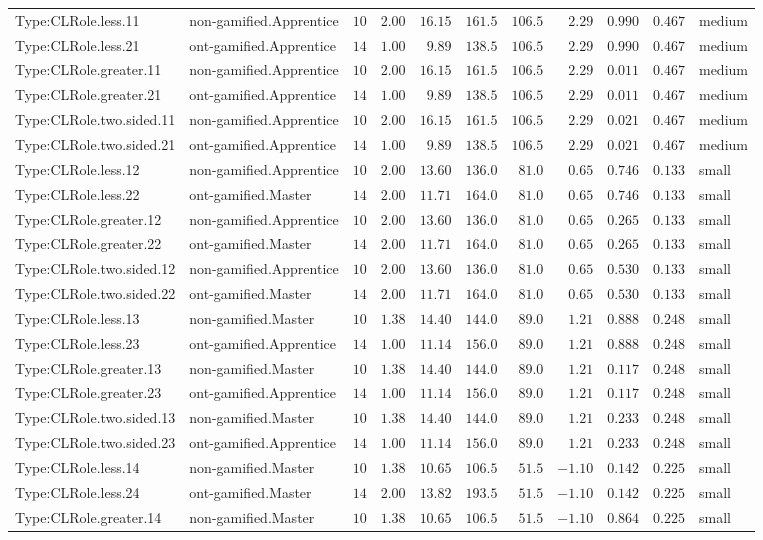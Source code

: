 \documentclass[6pt,a4paper]{article}
\begin{document}
{\begin{longtable}{llrrrrrrrrl}
Type:CLRole.less.11&non-gamified.Apprentice&$10$&$2.00$&$16.15$&$161.5$&$106.5$&$ 2.29$&$0.990$&$0.467$&medium\tabularnewline
Type:CLRole.less.21&ont-gamified.Apprentice&$14$&$1.00$&$ 9.89$&$138.5$&$106.5$&$ 2.29$&$0.990$&$0.467$&medium\tabularnewline
Type:CLRole.greater.11&non-gamified.Apprentice&$10$&$2.00$&$16.15$&$161.5$&$106.5$&$ 2.29$&$0.011$&$0.467$&medium\tabularnewline
Type:CLRole.greater.21&ont-gamified.Apprentice&$14$&$1.00$&$ 9.89$&$138.5$&$106.5$&$ 2.29$&$0.011$&$0.467$&medium\tabularnewline
Type:CLRole.two.sided.11&non-gamified.Apprentice&$10$&$2.00$&$16.15$&$161.5$&$106.5$&$ 2.29$&$0.021$&$0.467$&medium\tabularnewline
Type:CLRole.two.sided.21&ont-gamified.Apprentice&$14$&$1.00$&$ 9.89$&$138.5$&$106.5$&$ 2.29$&$0.021$&$0.467$&medium\tabularnewline
Type:CLRole.less.12&non-gamified.Apprentice&$10$&$2.00$&$13.60$&$136.0$&$ 81.0$&$ 0.65$&$0.746$&$0.133$&small\tabularnewline
Type:CLRole.less.22&ont-gamified.Master&$14$&$2.00$&$11.71$&$164.0$&$ 81.0$&$ 0.65$&$0.746$&$0.133$&small\tabularnewline
Type:CLRole.greater.12&non-gamified.Apprentice&$10$&$2.00$&$13.60$&$136.0$&$ 81.0$&$ 0.65$&$0.265$&$0.133$&small\tabularnewline
Type:CLRole.greater.22&ont-gamified.Master&$14$&$2.00$&$11.71$&$164.0$&$ 81.0$&$ 0.65$&$0.265$&$0.133$&small\tabularnewline
Type:CLRole.two.sided.12&non-gamified.Apprentice&$10$&$2.00$&$13.60$&$136.0$&$ 81.0$&$ 0.65$&$0.530$&$0.133$&small\tabularnewline
Type:CLRole.two.sided.22&ont-gamified.Master&$14$&$2.00$&$11.71$&$164.0$&$ 81.0$&$ 0.65$&$0.530$&$0.133$&small\tabularnewline
Type:CLRole.less.13&non-gamified.Master&$10$&$1.38$&$14.40$&$144.0$&$ 89.0$&$ 1.21$&$0.888$&$0.248$&small\tabularnewline
Type:CLRole.less.23&ont-gamified.Apprentice&$14$&$1.00$&$11.14$&$156.0$&$ 89.0$&$ 1.21$&$0.888$&$0.248$&small\tabularnewline
Type:CLRole.greater.13&non-gamified.Master&$10$&$1.38$&$14.40$&$144.0$&$ 89.0$&$ 1.21$&$0.117$&$0.248$&small\tabularnewline
Type:CLRole.greater.23&ont-gamified.Apprentice&$14$&$1.00$&$11.14$&$156.0$&$ 89.0$&$ 1.21$&$0.117$&$0.248$&small\tabularnewline
Type:CLRole.two.sided.13&non-gamified.Master&$10$&$1.38$&$14.40$&$144.0$&$ 89.0$&$ 1.21$&$0.233$&$0.248$&small\tabularnewline
Type:CLRole.two.sided.23&ont-gamified.Apprentice&$14$&$1.00$&$11.14$&$156.0$&$ 89.0$&$ 1.21$&$0.233$&$0.248$&small\tabularnewline
Type:CLRole.less.14&non-gamified.Master&$10$&$1.38$&$10.65$&$106.5$&$ 51.5$&$-1.10$&$0.142$&$0.225$&small\tabularnewline
Type:CLRole.less.24&ont-gamified.Master&$14$&$2.00$&$13.82$&$193.5$&$ 51.5$&$-1.10$&$0.142$&$0.225$&small\tabularnewline
Type:CLRole.greater.14&non-gamified.Master&$10$&$1.38$&$10.65$&$106.5$&$ 51.5$&$-1.10$&$0.864$&$0.225$&small\tabularnewline

\end{longtable}}
\end{document}
